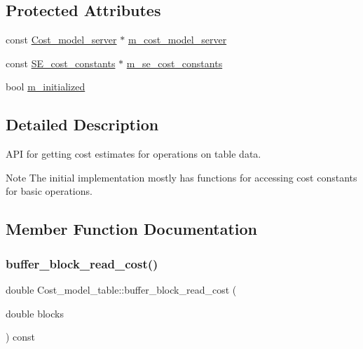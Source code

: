 \subsection*{Protected Attributes}
\begin{DoxyCompactItemize}
\item 
const \mbox{\hyperlink{classCost__model__server}{Cost\+\_\+model\+\_\+server}} $\ast$ \mbox{\hyperlink{classCost__model__table_a36e50fb6e4c0eb9944f08bb1cd14b24a}{m\+\_\+cost\+\_\+model\+\_\+server}}
\item 
const \mbox{\hyperlink{classSE__cost__constants}{S\+E\+\_\+cost\+\_\+constants}} $\ast$ \mbox{\hyperlink{classCost__model__table_a4afd938f845748bc0ba0e1dead1f2221}{m\+\_\+se\+\_\+cost\+\_\+constants}}
\item 
bool \mbox{\hyperlink{classCost__model__table_ac97e7bdd7006a4d6f6e2353866b3317d}{m\+\_\+initialized}}
\end{DoxyCompactItemize}


\subsection{Detailed Description}
A\+PI for getting cost estimates for operations on table data.

\begin{DoxyNote}{Note}
The initial implementation mostly has functions for accessing cost constants for basic operations. 
\end{DoxyNote}


\subsection{Member Function Documentation}
\mbox{\label{classCost__model__table_a3d409ece408a16a38f8ebdb6f713c59a}} 
\subsubsection{\texorpdfstring{buffer\+\_\+block\+\_\+read\+\_\+cost()}{buffer\_block\_read\_cost()}}
{\footnotesize\ttfamily double Cost\+\_\+model\+\_\+table\+::buffer\+\_\+block\+\_\+read\+\_\+cost (\begin{DoxyParamCaption}\item[{double}]{blocks }\end{DoxyParamCaption}) const\hspace{0.3cm}{\ttfamily [inline]}}

